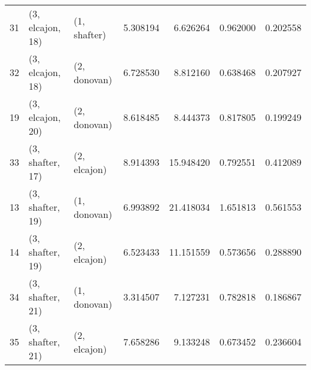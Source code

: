 \begin{tabular}{lllrrrr}
31 &  (3, elcajon, 18) &     (1, shafter) &   5.308194 &   6.626264 &   0.962000 &  0.202558 \\
32 &  (3, elcajon, 18) &     (2, donovan) &   6.728530 &   8.812160 &   0.638468 &  0.207927 \\
19 &  (3, elcajon, 20) &     (2, donovan) &   8.618485 &   8.444373 &   0.817805 &  0.199249 \\
33 &  (3, shafter, 17) &     (2, elcajon) &   8.914393 &  15.948420 &   0.792551 &  0.412089 \\
13 &  (3, shafter, 19) &     (1, donovan) &   6.993892 &  21.418034 &   1.651813 &  0.561553 \\
14 &  (3, shafter, 19) &     (2, elcajon) &   6.523433 &  11.151559 &   0.573656 &  0.288890 \\
34 &  (3, shafter, 21) &     (1, donovan) &   3.314507 &   7.127231 &   0.782818 &  0.186867 \\
35 &  (3, shafter, 21) &     (2, elcajon) &   7.658286 &   9.133248 &   0.673452 &  0.236604 \\
\bottomrule
\end{tabular}
